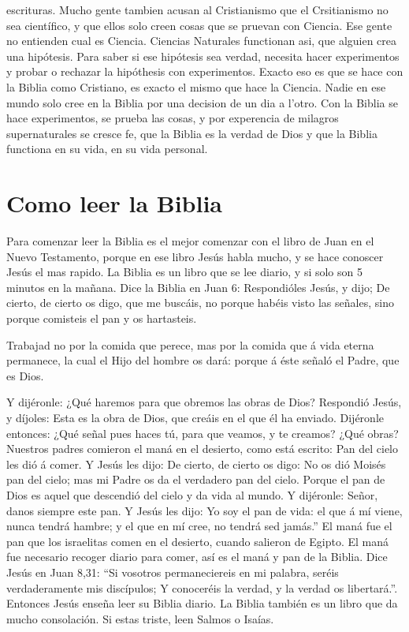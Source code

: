 escrituras. Mucho gente tambien acusan al Cristianismo que el
Crsitianismo no sea científico, y que ellos solo creen cosas que se
pruevan con Ciencia. Ese gente no entienden cual es Ciencia. Ciencias
Naturales functionan asi, que alguien crea una hipótesis. Para saber si
ese hipótesis sea verdad, necesita hacer experimentos y probar o
rechazar la hipóthesis con experimentos. Exacto eso es que se hace con
la Biblia como Cristiano, es exacto el mismo que hace la Ciencia. Nadie
en ese mundo solo cree en la Biblia por una decision de un dia a l'otro.
Con la Biblia se hace experimentos, se prueba las cosas, y por
experencia de milagros supernaturales se cresce fe, que la Biblia es la
verdad de Dios y que la Biblia functiona en su vida, en su vida
personal.

\hypertarget{como-leer-la-biblia}{%
\section{Como leer la Biblia}\label{como-leer-la-biblia}}

Para comenzar leer la Biblia es el mejor comenzar con el libro de Juan
en el Nuevo Testamento, porque en ese libro Jesús habla mucho, y se hace
conoscer Jesús el mas rapido. La Biblia es un libro que se lee diario, y
si solo son 5 minutos en la mañana. Dice la Biblia en Juan 6:
 Respondióles Jesús, y dijo; De cierto, de cierto os digo,
que me buscáis, no porque habéis visto las señales, sino porque
comisteis el pan y os hartasteis.

 Trabajad no por la comida que perece, mas por la comida
que á vida eterna permanece, la cual el Hijo del hombre os dará: porque
á éste señaló el Padre, que es Dios.

 Y dijéronle: ¿Qué haremos para que obremos las obras de
Dios?  Respondió Jesús, y díjoles: Esta es la obra de Dios,
que creáis en el que él ha enviado.  Dijéronle entonces:
¿Qué señal pues haces tú, para que veamos, y te creamos? ¿Qué obras?
 Nuestros padres comieron el maná en el desierto, como está
escrito: Pan del cielo les dió á comer.  Y Jesús les dijo:
De cierto, de cierto os digo: No os dió Moisés pan del cielo; mas mi
Padre os da el verdadero pan del cielo.  Porque el pan de
Dios es aquel que descendió del cielo y da vida al mundo. 
Y dijéronle: Señor, danos siempre este pan.  Y Jesús les
dijo: Yo soy el pan de vida: el que á mí viene, nunca tendrá hambre; y
el que en mí cree, no tendrá sed jamás.'' El maná fue el pan que los
israelitas comen en el desierto, cuando salieron de Egipto. El maná fue
necesario recoger diario para comer, así es el maná y pan de la Biblia.
Dice Jesús en Juan 8,31: ``Si vosotros permaneciereis en mi palabra,
seréis verdaderamente mis discípulos; Y conoceréis la verdad, y la
verdad os libertará.''. Entonces Jesús enseña leer su Biblia diario. La
Biblia también es un libro que da mucho consolación. Si estas triste,
leen Salmos o Isaías.

